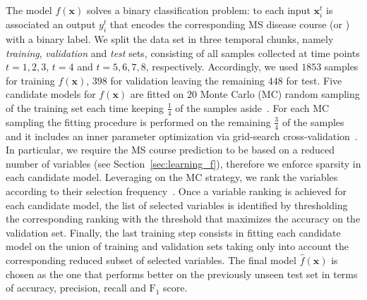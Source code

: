 The \F model $f(\bm{x})$ solves a binary classification problem: to each input $\bm{x}_i^t$ is associated  an output $y_i^t$ that encodes the corresponding MS disease course (\RR or \SP) with a binary label.
We split the data set in three temporal chunks, namely {\em training}, {\em validation} and {\em test} sets, consisting of all samples collected at time points $t=1,2,3$, $t=4$ and $t=5,6,7,8$, respectively.
Accordingly, we used $1853$ samples for training $f(\bm{x})$, $398$ for validation leaving the remaining $448$ for test.
Five candidate models for $f(\bm{x})$ are fitted on $20$ Monte Carlo (MC) random sampling of the training set each time keeping $\frac{1}{4}$ of the samples aside~\cite{molinaro2005prediction}. For each MC sampling the fitting procedure is performed on the remaining $\frac{3}{4}$ of the samples and it includes an inner parameter optimization via grid-search cross-validation~\cite{hastie2009elements}. In particular, we require the MS course prediction to be based on a reduced number of variables (see Section~\ref{sec:learning_f}), therefore we enforce sparsity in each candidate model.
Leveraging on the MC strategy, we rank the variables according to their selection frequency~\cite{barbieri16palladio, meinshausen2010stability}.
Once a variable ranking is achieved for each candidate model, the list of selected variables is identified by thresholding the corresponding ranking with the threshold that maximizes the accuracy on the validation set. Finally, the last training step consists in fitting each candidate model on the union of training and validation sets taking only into account the corresponding reduced subset of selected variables. The final \F model $\hat{f}(\bm{x})$ is chosen as the one that performs better on the previously unseen test set in terms of accuracy, precision, recall and $\text{F}_1$ score.

